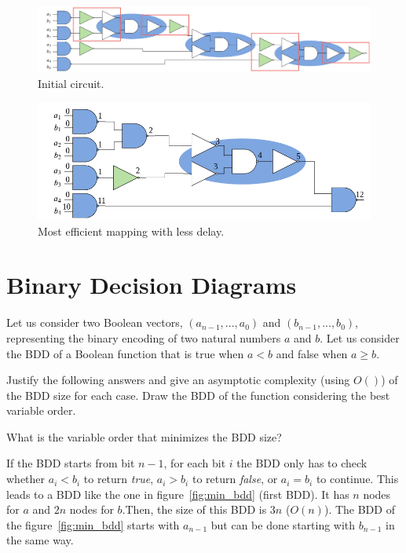\documentclass[a4paper, 10pt]{article}
\begin{document}
\begin{figure}[htbp]
    \centering
    \includegraphics[width=\linewidth]{3_3_2.png}
    \caption{Initial circuit.}
    \label{fig:init_circuit_delay}
\end{figure}


\begin{figure}[htbp]
    \centering
    \includegraphics[width=0.7\linewidth]{3_3_3.png}
    \caption{Most efficient mapping with less delay.}
    \label{fig:best_mapping_delay}
\end{figure}

\section{Binary Decision Diagrams}
{\color{statement} Let us consider two Boolean vectors, $(a_{n-1}, ..., a_0)$ and $(b_{n-1} , ..., b_0)$, representing the binary encoding of two natural numbers $a$ and $b$. Let us consider the BDD of a Boolean function that is true when $a < b$ and false when $a \geq b$.

Justify the following answers and give an asymptotic complexity (using $O()$) of the BDD size for each case. Draw the BDD of the function considering the best variable order.} 

{\color{statement} What is the variable order that minimizes the BDD size?}

If the BDD starts from bit $n-1$, for each bit $i$ the BDD only has to check whether $a_{i} < b_{i}$ to return \textit{true}, $a_{i} > b_{i}$ to return \textit{false}, or $a_{i} = b_{i}$ to continue. This leads to a BDD like the one in figure~\ref{fig:min_bdd} (first BDD). It has $n$ nodes for $a$ and $2n$ nodes for $b$.Then, the size of this BDD is $3n$ ($O(n)$). The BDD of the figure~\ref{fig:min_bdd} starts with $a_{n-1}$ but can be done starting with $b_{n-1}$ in the same way.
\end{document}
